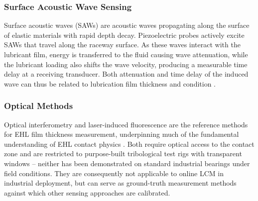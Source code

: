 \subsubsection{Surface Acoustic Wave Sensing}
\label{subsubsec:saw}
Surface acoustic waves (SAWs) are acoustic waves propagating along the surface of elastic materials with rapid depth decay. Piezoelectric probes actively excite SAWs that travel along the raceway surface. As these waves interact with the lubricant film, energy is transferred to the fluid causing wave attenuation, while the lubricant loading also shifts the wave velocity, producing a measurable time delay at a receiving transducer. Both attenuation and time delay of the induced wave can thus be related to lubrication film thickness and condition \cite{lindner_a23_2011}.

\subsubsection{Optical Methods}
\label{subsubsec:optical}
Optical interferometry and laser-induced fluorescence are the reference methods for EHL film thickness measurement, underpinning much of the fundamental understanding of EHL contact physics \cite{shang_comprehensive_2024}. Both require optical access to the contact zone and are restricted to purpose-built tribological test rigs with transparent windows -- neither has been demonstrated on standard industrial bearings under field conditions. They are consequently not applicable to online LCM in industrial deployment, but can serve as ground-truth measurement methods against which other sensing approaches are calibrated.
